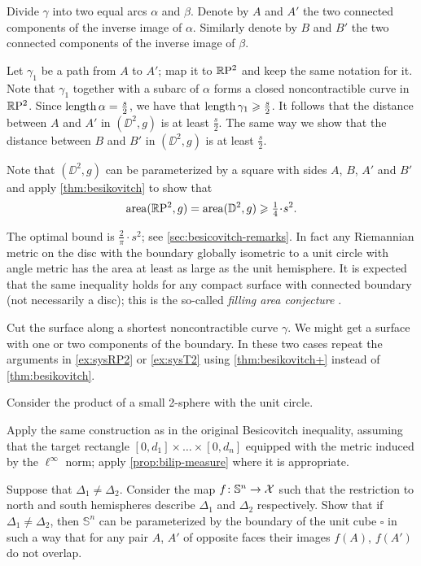 Divide $\gamma$ into two equal arcs $\alpha$ and $\beta$.
Denote by $A$ and $A'$ the two connected components of the inverse image of $\alpha$.
Similarly denote by $B$ and $B'$ the two connected components of the inverse image of $\beta$.

Let $\gamma_1$ be a path from $A$ to $A'$;
map it to $\mathbb{R}\mathrm{P}^2$ and keep the same notation for it.
Note that $\gamma_1$ together with a subarc of $\alpha$ forms a closed noncontractible curve in $\mathbb{R}\mathrm{P}^2$.
Since $\mathop{\rm length}\nolimits\alpha=\tfrac s2$, we have that $\mathop{\rm length}\nolimits\gamma_1\geqslant \tfrac s2$.
It follows that the distance between $A$ and $A'$ in $(\DD^2,g)$ is at least $\tfrac s2$.
The same way we show that the distance between $B$ and $B'$ in $(\DD^2,g)$ is at least $\tfrac s2$.

Note that $(\DD^2,g)$ can be parameterized by a square with sides $A$, $B$, $A'$ and $B'$ and apply \ref{thm:besikovitch} to show that 
\[\area(\RP^2,g)=\area(\DD^2,g)\ge \tfrac14\cdot s^2.\]

The optimal bound is $\tfrac2 \pi\cdot s^2$; see  \ref{sec:besicovitch-remarks}.
In fact any Riemannian metric on the disc with the boundary globally isometric to a unit circle with angle metric has the area at least as large as the unit hemisphere.
It is expected that the same inequality holds for any compact surface with connected boundary (not necessarily a disc);
this is the so-called \emph{filling area conjecture} \cite[it is mentioned Mikhael Gromov in 5.5.$\mathrm{B}'(\mathrm{e}')$ of][]{gromov-1983}.

 Cut the surface along a shortest noncontractible curve $\gamma$. 
We might get a surface with one or two components of the boundary.
In these two cases repeat the arguments in \ref{ex:sysRP2} or \ref{ex:sysT2} using \ref{thm:besikovitch+} instead of \ref{thm:besikovitch}.


 Consider the product of a small 2-sphere with the unit circle.

Apply the same construction as in the original Besicovitch inequality, assuming that the target rectangle
$[0,d_1]\times\dots\times [0,d_n]$ equipped with the metric induced by the $\ell^\infty$ norm;
apply \ref{prop:bilip-measure} where it is appropriate.

 Suppose that $\Delta_1\ne\Delta_2$.
Consider the map $f\colon\mathbb{S}^n\to \mathcal{X}$ such that the restriction to north and south hemispheres describe $\Delta_1$ and $\Delta_2$ respectively.
Show that if $\Delta_1\ne\Delta_2$, then $\mathbb{S}^n$ can be parameterized by the boundary of the unit cube $\square$ in such a way that for any pair $A$, $A'$ of opposite faces their images $f(A)$, $f(A')$ do not overlap.

